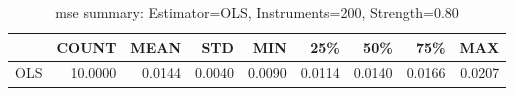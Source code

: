 \begin{table}[ht]
\centering
\caption{mse summary: Estimator=OLS, Instruments=200, Strength=0.80}
\begin{tabular}{lrrrrrrrr}
\toprule
 & COUNT & MEAN & STD & MIN & 25\% & 50\% & 75\% & MAX \\
\midrule
OLS & 10.0000 & 0.0144 & 0.0040 & 0.0090 & 0.0114 & 0.0140 & 0.0166 & 0.0207 \\
\bottomrule
\end{tabular}
\end{table}
